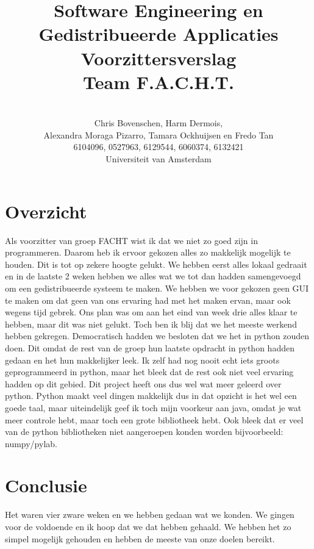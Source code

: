 \documentclass[a4paper,10pt]{article}
\title{Software Engineering en Gedistribueerde Applicaties \\[10pt]Voorzittersverslag\\[25pt]Team F.A.C.H.T.}
\author{\\Chris Bovenschen, Harm Dermois, \\Alexandra Moraga Pizarro, Tamara Ockhuijsen en Fredo Tan \\[10pt]6104096, 0527963, 6129544, 6060374, 6132421 \\[25pt]Universiteit van Amsterdam}
\begin{document}
\maketitle
\newpage
\section{Overzicht}
Als voorzitter van groep FACHT wist ik dat we niet zo goed zijn in programmeren. Daarom heb ik ervoor gekozen alles zo makkelijk mogelijk te
houden. Dit is tot op zekere hoogte gelukt. We hebben eerst alles lokaal 
gedraait en in de laatste 2 weken hebben we alles wat we tot dan hadden
samengevoegd  om een gedistribueerde systeem te maken. We hebben we voor
gekozen geen GUI te maken om dat geen van ons ervaring had met het maken ervan, maar ook wegens tijd gebrek. Ons plan was om aan het eind van week drie
alles klaar te hebben, maar dit was niet gelukt. Toch ben ik blij dat we het meeste werkend hebben gekregen. 
Democratisch hadden we besloten dat we het in python zouden doen. Dit omdat de rest van de groep hun laatste opdracht in python hadden gedaan en het hun 
makkelijker leek. Ik zelf had nog nooit echt iets groots geprogrammeerd in python, maar het bleek dat de rest ook niet veel ervaring hadden op dit gebied.
Dit project heeft ons dus wel wat meer geleerd over python. Python maakt veel dingen makkelijk dus in dat opzicht is het wel een goede taal, maar uiteindelijk geef ik toch mijn voorkeur aan java, omdat je wat meer controle
hebt, maar toch een grote bibliotheek hebt. Ook bleek dat er veel van de python
bibliotheken niet aangeroepen konden worden bijvoorbeeld: numpy/pylab.
\section{Conclusie}
Het waren vier zware weken en we hebben gedaan wat we konden. We gingen voor de
voldoende en ik hoop dat we dat hebben gehaald. We hebben het zo simpel 
mogelijk gehouden en hebben de meeste van onze doelen bereikt.
\end{document}
